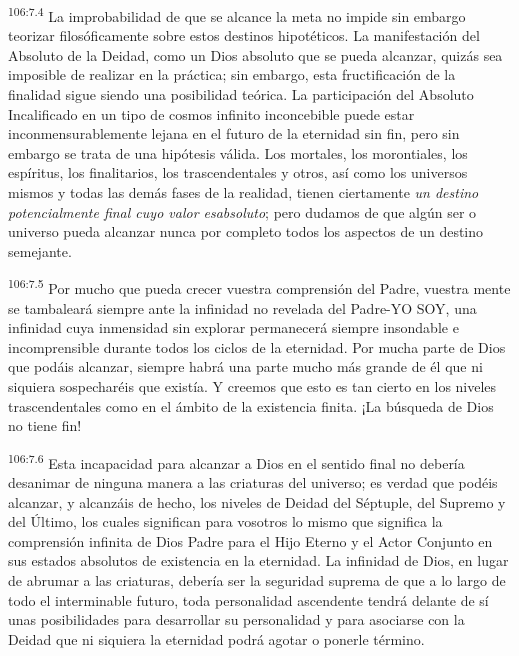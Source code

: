 \par
\textsuperscript{106:7.4} La improbabilidad de que se alcance la meta no impide sin embargo teorizar filosóficamente sobre estos destinos hipotéticos. La manifestación del Absoluto de la Deidad, como un Dios absoluto que se pueda alcanzar, quizás sea imposible de realizar en la práctica; sin embargo, esta fructificación de la finalidad sigue siendo una posibilidad teórica. La participación del Absoluto Incalificado en un tipo de cosmos infinito inconcebible puede estar inconmensurablemente lejana en el futuro de la eternidad sin fin, pero sin embargo se trata de una hipótesis válida. Los mortales, los morontiales, los espíritus, los finalitarios, los trascendentales y otros, así como los universos mismos y todas las demás fases de la realidad, tienen ciertamente \textit{un destino potencialmente final cuyo valor esabsoluto}; pero dudamos de que algún ser o universo pueda alcanzar nunca por completo todos los aspectos de un destino semejante.

\par
\textsuperscript{106:7.5} Por mucho que pueda crecer vuestra comprensión del Padre, vuestra mente se tambaleará siempre ante la infinidad no revelada del Padre-YO SOY, una infinidad cuya inmensidad sin explorar permanecerá siempre insondable e incomprensible durante todos los ciclos de la eternidad. Por mucha parte de Dios que podáis alcanzar, siempre habrá una parte mucho más grande de él que ni siquiera sospecharéis que existía. Y creemos que esto es tan cierto en los niveles trascendentales como en el ámbito de la existencia finita. ¡La búsqueda de Dios no tiene fin!

\par
\textsuperscript{106:7.6} Esta incapacidad para alcanzar a Dios en el sentido final no debería desanimar de ninguna manera a las criaturas del universo; es verdad que podéis alcanzar, y alcanzáis de hecho, los niveles de Deidad del Séptuple, del Supremo y del Último, los cuales significan para vosotros lo mismo que significa la comprensión infinita de Dios Padre para el Hijo Eterno y el Actor Conjunto en sus estados absolutos de existencia en la eternidad. La infinidad de Dios, en lugar de abrumar a las criaturas, debería ser la seguridad suprema de que a lo largo de todo el interminable futuro, toda personalidad ascendente tendrá delante de sí unas posibilidades para desarrollar su personalidad y para asociarse con la Deidad que ni siquiera la eternidad podrá agotar o ponerle término.

